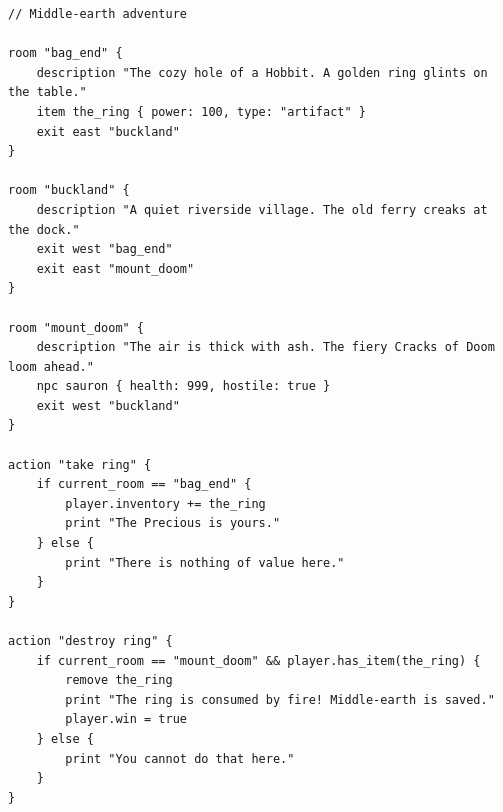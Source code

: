\documentclass[12pt, a4paper]{article}
\begin{document}
\begin{lstlisting}[style=dc, caption={Middle-Earth Adventure --- full demo program}]
// Middle-earth adventure

room "bag_end" {
    description "The cozy hole of a Hobbit. A golden ring glints on the table."
    item the_ring { power: 100, type: "artifact" }
    exit east "buckland"
}

room "buckland" {
    description "A quiet riverside village. The old ferry creaks at the dock."
    exit west "bag_end"
    exit east "mount_doom"
}

room "mount_doom" {
    description "The air is thick with ash. The fiery Cracks of Doom loom ahead."
    npc sauron { health: 999, hostile: true }
    exit west "buckland"
}

action "take ring" {
    if current_room == "bag_end" {
        player.inventory += the_ring
        print "The Precious is yours."
    } else {
        print "There is nothing of value here."
    }
}

action "destroy ring" {
    if current_room == "mount_doom" && player.has_item(the_ring) {
        remove the_ring
        print "The ring is consumed by fire! Middle-earth is saved."
        player.win = true
    } else {
        print "You cannot do that here."
    }
}
\end{lstlisting}
\end{document}
